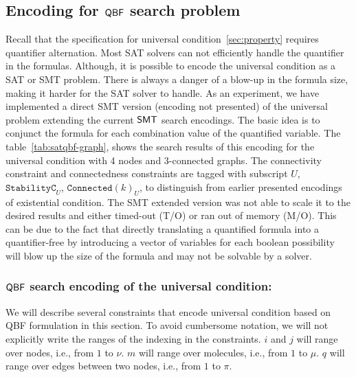 \subsection{Encoding for $\mathsf{QBF}$ search problem}\label{enc:univ-cond}
%

Recall that the specification for universal condition~\ref{sec:property} requires quantifier alternation. 
%
Most SAT solvers can not efficiently handle the quantifier in the formulas. 
% 
Although, it is possible to encode the universal condition as a SAT or SMT problem.
%
There is always a danger of a blow-up in the formula size, making it harder for the SAT solver to handle. 
% 
As an experiment, we have implemented a direct SMT version (encoding not presented) of the universal problem extending the current $\mathsf{SMT}$ search encodings.
%
The basic idea is to conjunct the formula for each combination value of the quantified variable. 
%
The table~\ref{tab:satqbf-graph}, shows the search results of this encoding for the universal condition with 4 nodes and 3-connected graphs. 
%
The connectivity constraint and connectedness constraints are tagged with subscript $U$, $\texttt{StabilityC}_{U}$, $\texttt{Connected}(k)_{U}$,  to distinguish from earlier presented encodings of existential condition.
%
The SMT extended version was not able to scale it to the desired results and either timed-out (T/O) or ran out of memory (M/O).
%
This can be due to the fact that directly translating a quantified formula into a quantifier-free  by introducing a vector of variables for each boolean possibility will blow up the size of the formula and may not be solvable by a solver.
%
%
\subsubsection{$\mathsf{QBF}$ search encoding of the universal condition:}
We will describe several constraints that encode universal condition based on QBF formulation in this section.
%
To avoid cumbersome notation, we will not explicitly write the ranges
of the indexing in the constraints.
%
$i$ and $j$ will range over nodes, i.e., from $1$ to $\nu$.
%
$m$ will range over molecules, i.e., from $1$ to $\mu$.
%
$q$ will range over edges between two nodes, i.e., from $1$ to $\pi$.
%

